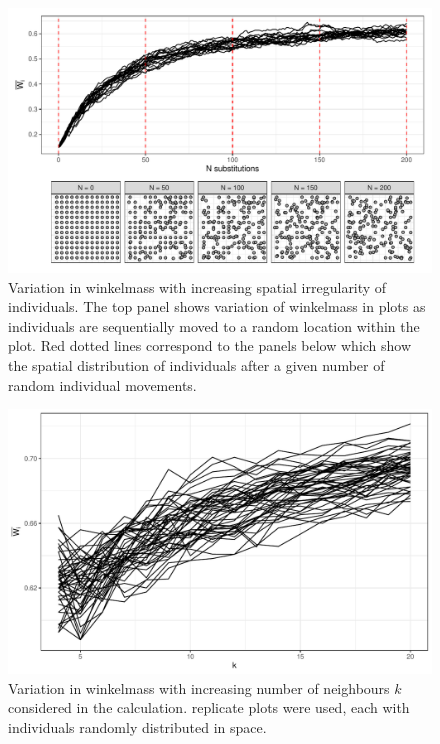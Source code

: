 \documentclass[11pt,a4paper]{article}
\begin{document}
\begin{figure}[H]
\centering
	\includegraphics[width=\textwidth]{wi_diagram}
	\caption{Variation in winkelmass with increasing spatial irregularity of individuals. The top panel shows variation of winkelmass in \wireps{} plots as individuals are sequentially moved to a random location within the plot. Red dotted lines correspond to the panels below which show the spatial distribution of individuals after a given number of random individual movements.}
	\label{wi_diagram}
\end{figure}

\begin{figure}[H]
\centering
	\includegraphics[width=\textwidth]{wi_k}
	\caption{Variation in winkelmass with increasing number of neighbours $k$ considered in the calculation. \wikn{} replicate plots were used, each with \wiki{} individuals randomly distributed in space.}
	\label{wi_k}
\end{figure}
\end{document}

